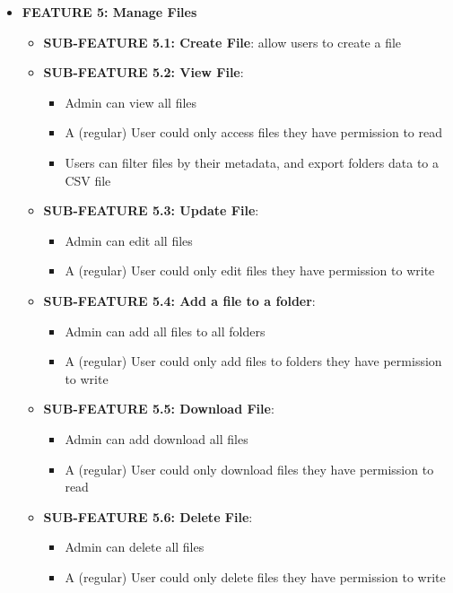 \begin{itemize}
    \item \textbf{FEATURE 5: Manage Files}
    \begin{itemize}
        \item \textbf{SUB-FEATURE 5.1: Create File}: allow users to create a file
        \item \textbf{SUB-FEATURE 5.2: View File}: 
            \begin{itemize}
                \item Admin can view all files
                \item A (regular) User could only access files they have permission to read
                \item Users can filter files by their metadata, and export folders data to a CSV file
            \end{itemize}
        \item \textbf{SUB-FEATURE 5.3: Update File}: 
            \begin{itemize}
                \item Admin can edit all files
                \item A (regular) User could only edit files they have permission to write
            \end{itemize}
        \item \textbf{SUB-FEATURE 5.4: Add a file to a folder}: 
            \begin{itemize}
                \item Admin can add all files to all folders
                \item A (regular) User could only add files to folders they have permission to write
            \end{itemize}
        \item \textbf{SUB-FEATURE 5.5: Download File}: 
            \begin{itemize}
                \item Admin can add download all files
                \item A (regular) User could only download files they have permission to read
            \end{itemize}
        \item \textbf{SUB-FEATURE 5.6: Delete File}:
            \begin{itemize}
                \item Admin can delete all files
                \item A (regular) User could only delete files they have permission to write
            \end{itemize}
    \end{itemize}
    

\end{itemize}
